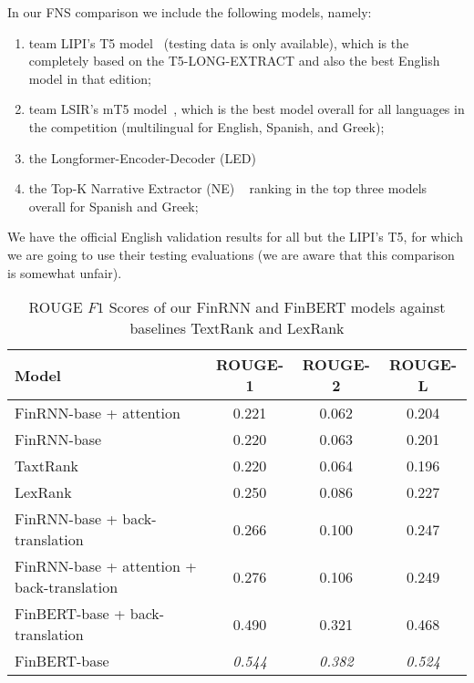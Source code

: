 In our FNS comparison we include the following models, namely:
\begin{enumerate}
    \item team LIPI's T5 model~\cite{el-haj-etal-2022-financial} (testing data is only available), which is the completely based on the T5-LONG-EXTRACT and also the best English model in that edition;
    \item team LSIR's mT5 model~\cite{foroutan-etal-2022-multilingual}, which is the best model overall for all languages in the competition (multilingual for English, Spanish, and Greek);
    \item the Longformer-Encoder-Decoder (LED)~\cite{khanna-etal-2022-transformer}
    \item the Top-K Narrative Extractor (NE) ~\cite{shukla-etal-2022-dimsum}  ranking in the top three models overall for Spanish and Greek;
\end{enumerate}
We have the official English validation results for all but the LIPI's T5, for which we are going to use their testing evaluations (we are aware that this comparison is somewhat unfair).

\begin{table}[ht]
    \centering
    \begin{tabular}{lccc}
        \toprule
        \textbf{Model} & \textbf{ROUGE-1} & \textbf{ROUGE-2} & \textbf{ROUGE-L} \\
        \midrule
            FinRNN-base + attention & 0.221 & 0.062 & 0.204 \\
            FinRNN-base & 0.220 & 0.063 & 0.201 \\
            TaxtRank & 0.220 & 0.064 & 0.196 \\
            LexRank & 0.250 & 0.086 & 0.227 \\
        \midrule
            FinRNN-base + back-translation & 0.266 & 0.100 & 0.247 \\
            FinRNN-base + attention + back-translation & 0.276 & 0.106 & 0.249 \\
            FinBERT-base + back-translation & 0.490 & 0.321 & 0.468 \\
            FinBERT-base & \emph{0.544} & \emph{0.382} & \emph{0.524} \\
        \bottomrule
    \end{tabular}\caption{ROUGE $F1$ Scores of our FinRNN and FinBERT models against baselines TextRank and LexRank}
    \label{tab:rouge_performance_validation}
\end{table}

